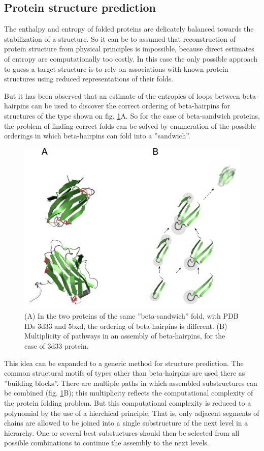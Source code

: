 \documentclass[12pt,aps]{revtex4}
\begin{document}
\subsection{Protein structure prediction}

The enthalpy and entropy of folded proteins are delicately balanced towards the
stabilization of a structure. So it can be to assumed that
reconstruction of protein structure from physical principles is impossible, because
direct estimates of entropy are computationally too costly. In this case the only possible approach to guess a target structure is to rely on associations with known protein structures using reduced representations of their folds. 

But it has been observed that an estimate of the entropies of loops between
beta-hairpins can be used to discover the correct ordering of beta-hairpins for
structures of the type shown on fig. \ref{fig_folding}A. So for the case of beta-sandwich proteins,
the problem of finding correct folds can be solved by enumeration of the possible
orderings in which beta-hairpins can fold into a ''sandwich''.

\begin{figure}[h]
\centerline{\includegraphics[width=0.95\columnwidth]{fig_folding.png}}
\caption{(A) In the two proteins of the same ''beta-sandwich'' fold, with PDB IDs 3d33
and 5bxd, the ordering of beta-hairpins is different. (B) Multiplicity of pathways
in an assembly of beta-hairpins, for the case of 3d33 protein.}
\label{fig_folding}
\end{figure}

This idea can be expanded to a generic method for structure prediction. The common
structural motifs of types other than beta-hairpins are used there as ''building
blocks''. There are multiple paths in which assembled substructures can be combined
(fig. \ref{fig_folding}B); this multiplicity reflects the computational complexity of the protein
folding problem. But this computational complexity is reduced to a polynomial by the
use of a hierchical principle. That is, only adjacent segments of chains are allowed
to be joined into a single substructure of the next level in a hierarchy. One or
several best substuctures should then be selected from all possible combinations to
continue the assembly to the next levels.
\end{document}
